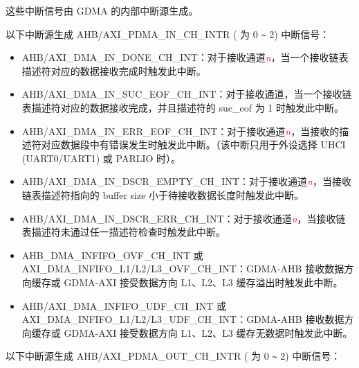 \documentclass[main\_\_CN.tex]{subfiles}
\begin{document}
这些中断信号由 GDMA 的内部中断源生成。

以下中断源生成 AHB/AXI\_PDMA\_IN\_CH\_INTR ( 为 0 \verb+~+ 2) 中断信号：

\begin{itemize}
    \item \label{int:GDMAINDONEINT}AHB/AXI\_DMA\_IN\_DONE\_CH\_INT：对于接收通道\textcolor{red}{\it{n}}，当一个接收链表描述符对应的数据接收完成时触发此中断。
    \item \label{int:GDMAINSUCEOFINT}AHB/AXI\_DMA\_IN\_SUC\_EOF\_CH\_INT：对于接收通道，当一个接收链表描述符对应的数据接收完成，并且描述符的 suc\_eof 为 1 时触发此中断。
    \item \label{int:GDMAINERREOFINT}AHB/AXI\_DMA\_IN\_ERR\_EOF\_CH\_INT：对于接收通道\textcolor{red}{\it{n}}，当接收的描述符对应数据段中有错误发生时触发此中断。（该中断只用于外设选择 UHCI (UART0/UART1) 或 PARLIO 时）。
    \item \label{int:GDMAINDSCREMPTYINT}AHB/AXI\_DMA\_IN\_DSCR\_EMPTY\_CH\_INT：对于接收通道\textcolor{red}{\it{n}}，当接收链表描述符指向的 buffer size 小于待接收数据长度时触发此中断。
    \item \label{int:GDMAINDSCRERRINT}AHB/AXI\_DMA\_IN\_DSCR\_ERR\_CH\_INT：对于接收通道\textcolor{red}{\it{n}}，当接收链表描述符未通过任一描述符检查时触发此中断。
    \item \label{int:GDMAINFIFOOVFINT} AHB\_DMA\_INFIFO\_OVF\_CH\_INT 或 AXI\_DMA\_INFIFO\_L1/L2/L3\_OVF\_CH\_INT：GDMA-AHB 接收数据方向缓存或 GDMA-AXI 接受数据方向 L1、L2、L3 缓存溢出时触发此中断。
    \item \label{int:GDMAINFIFOUDFINT}AHB/AXI\_DMA\_INFIFO\_UDF\_CH\_INT 或 AXI\_DMA\_INFIFO\_L1/L2/L3\_UDF\_CH\_INT：GDMA-AHB 接收数据方向缓存或 GDMA-AXI 接受数据方向 L1、L2、L3 缓存无数据时触发此中断。
\end{itemize}

以下中断源生成 AHB/AXI\_PDMA\_OUT\_CH\_INTR ( 为 0 \verb+~+ 2) 中断信号：
\end{document}
